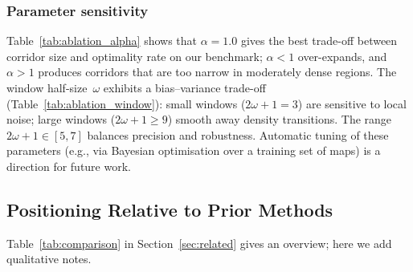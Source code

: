 \documentclass[journal]{IEEEtran}
\begin{document}
\subsubsection{Parameter sensitivity}
Table~\ref{tab:ablation_alpha} shows that $\alpha = 1.0$ gives the best trade-off between corridor size and optimality rate on our benchmark; $\alpha < 1$ over-expands, and $\alpha > 1$ produces corridors that are too narrow in moderately dense regions.
The window half-size~$\omega$ exhibits a bias--variance trade-off (Table~\ref{tab:ablation_window}): small windows ($2\omega{+}1 = 3$) are sensitive to local noise; large windows ($2\omega{+}1 \geq 9$) smooth away density transitions.
The range $2\omega{+}1 \in [5, 7]$ balances precision and robustness.
Automatic tuning of these parameters (e.g., via Bayesian optimisation over a training set of maps) is a direction for future work.

\subsection{Positioning Relative to Prior Methods}

Table~\ref{tab:comparison} in Section~\ref{sec:related} gives an overview; here we add qualitative notes.
\end{document}
